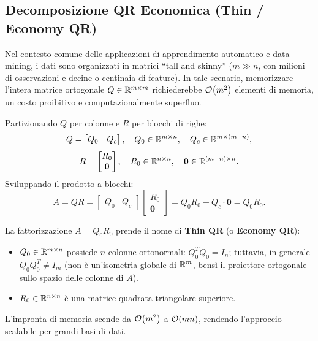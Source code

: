 \subsection{Decomposizione QR Economica (Thin / Economy QR)}
Nel contesto comune delle applicazioni di apprendimento automatico e data mining, i dati sono organizzati in matrici ``tall and skinny'' ($m \gg n$, con milioni di osservazioni e decine o centinaia di feature). In tale scenario, memorizzare l'intera matrice ortogonale $Q \in \mathbb{R}^{m \times m}$ richiederebbe $\mathcal{O}\!\left(m^2\right)$ elementi di memoria, un costo proibitivo e computazionalmente superfluo.

Partizionando $Q$ per colonne e $R$ per blocchi di righe:
\begin{equation}
    Q = \begin{bmatrix} Q_0 & Q_c \end{bmatrix}, \quad Q_0 \in \mathbb{R}^{m \times n}, \quad Q_c \in \mathbb{R}^{m \times (m-n)},
\end{equation}
\begin{equation}
    R = \begin{bmatrix} R_0 \\ \mathbf{0} \end{bmatrix}, \quad R_0 \in \mathbb{R}^{n \times n}, \quad \mathbf{0} \in \mathbb{R}^{(m-n) \times n}.
\end{equation}
Sviluppando il prodotto a blocchi:
\begin{equation}
    A = Q R = \begin{bmatrix} Q_0 & Q_c \end{bmatrix} \begin{bmatrix} R_0 \\ \mathbf{0} \end{bmatrix} = Q_0 R_0 + Q_c \cdot \mathbf{0} = Q_0 R_0.
\end{equation}

\begin{definition}
\label{def:thin-qr}
La fattorizzazione $A = Q_0 R_0$ prende il nome di \textbf{Thin QR} (o \textbf{Economy QR}):
\begin{itemize}
    \item $Q_0 \in \mathbb{R}^{m \times n}$ possiede $n$ colonne ortonormali: $Q_0^T Q_0 = I_n$; tuttavia, in generale $Q_0 Q_0^T \neq I_m$ (non \`e un'isometria globale di $\mathbb{R}^m$, bens\`i il proiettore ortogonale sullo spazio delle colonne di $A$).
    \item $R_0 \in \mathbb{R}^{n \times n}$ \`e una matrice quadrata triangolare superiore.
\end{itemize}
L'impronta di memoria scende da $\mathcal{O}\!\left(m^2\right)$ a $\mathcal{O}\!\left(mn\right)$, rendendo l'approccio scalabile per grandi basi di dati.
\end{definition}

